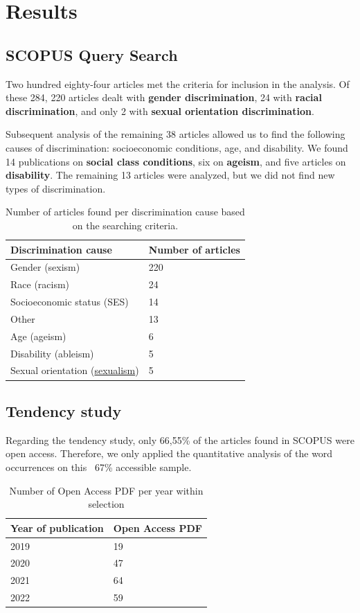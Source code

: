 \documentclass[runningheads]{llncs}
\begin{document}
\section{Results}
\subsection{SCOPUS Query Search}
Two hundred eighty-four articles met the criteria for inclusion in the analysis. Of these 284, 220 articles dealt with \textbf{gender discrimination}, 24 with \textbf{racial discrimination}, and only 2 with \textbf{sexual orientation discrimination}. 

Subsequent analysis of the remaining 38 articles allowed us to find the following causes of discrimination: socioeconomic conditions, age, and disability. We found 14 publications on \textbf{social class conditions}, six on \textbf{ageism}, and five articles on \textbf{disability}. The remaining 13 articles were analyzed, but we did not find new types of discrimination.
\begin{table}
\caption{Number of articles found per discrimination cause based on the searching criteria.}\label{tab1}
\centering
\begin{tabular}{|l|l|}
\hline
Discrimination cause & Number of articles\\
\hline
Gender (sexism) & 220 \\
Race (racism) & 24 \\
Socioeconomic status (SES) & 14 \\
Other & 13 \\
Age (ageism) & 6 \\
Disability (ableism) & 5 \\
Sexual orientation (\href{https://www.collinsdictionary.com/dictionary/english/sexualism}{sexualism}) & 5 \\ 
\hline
\end{tabular}
\end{table}
\subsection{Tendency study}
Regarding the tendency study, only 66,55\% of the articles found in SCOPUS were open access. Therefore, we only applied the quantitative analysis of the word occurrences on this ~67\% accessible sample.
\begin{table}
\caption{Number of Open Access PDF per year within selection}\label{tab2}
\centering
\begin{tabular}{|l|l|}
\hline
Year of publication & Open Access PDF\\
\hline
2019 & 19 \\
2020 & 47 \\
2021 & 64 \\
2022 & 59 \\
\hline
\end{tabular}
\end{table}
\end{document}
